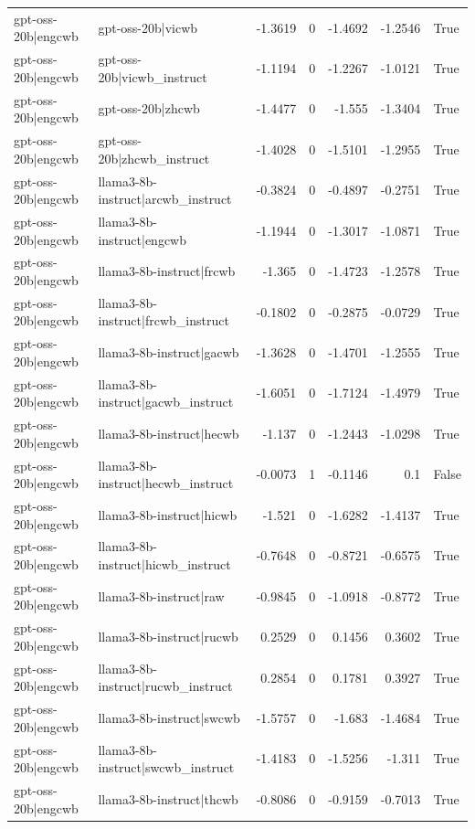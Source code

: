 \begin{table}
\begin{tabular}{l l r r r r l}
gpt-oss-20b|engcwb & gpt-oss-20b|vicwb & -1.3619 & 0 & -1.4692 & -1.2546 & True \\
gpt-oss-20b|engcwb & gpt-oss-20b|vicwb_instruct & -1.1194 & 0 & -1.2267 & -1.0121 & True \\
gpt-oss-20b|engcwb & gpt-oss-20b|zhcwb & -1.4477 & 0 & -1.555 & -1.3404 & True \\
gpt-oss-20b|engcwb & gpt-oss-20b|zhcwb_instruct & -1.4028 & 0 & -1.5101 & -1.2955 & True \\
gpt-oss-20b|engcwb & llama3-8b-instruct|arcwb_instruct & -0.3824 & 0 & -0.4897 & -0.2751 & True \\
gpt-oss-20b|engcwb & llama3-8b-instruct|engcwb & -1.1944 & 0 & -1.3017 & -1.0871 & True \\
gpt-oss-20b|engcwb & llama3-8b-instruct|frcwb & -1.365 & 0 & -1.4723 & -1.2578 & True \\
gpt-oss-20b|engcwb & llama3-8b-instruct|frcwb_instruct & -0.1802 & 0 & -0.2875 & -0.0729 & True \\
gpt-oss-20b|engcwb & llama3-8b-instruct|gacwb & -1.3628 & 0 & -1.4701 & -1.2555 & True \\
gpt-oss-20b|engcwb & llama3-8b-instruct|gacwb_instruct & -1.6051 & 0 & -1.7124 & -1.4979 & True \\
gpt-oss-20b|engcwb & llama3-8b-instruct|hecwb & -1.137 & 0 & -1.2443 & -1.0298 & True \\
gpt-oss-20b|engcwb & llama3-8b-instruct|hecwb_instruct & -0.0073 & 1 & -0.1146 & 0.1 & False \\
gpt-oss-20b|engcwb & llama3-8b-instruct|hicwb & -1.521 & 0 & -1.6282 & -1.4137 & True \\
gpt-oss-20b|engcwb & llama3-8b-instruct|hicwb_instruct & -0.7648 & 0 & -0.8721 & -0.6575 & True \\
gpt-oss-20b|engcwb & llama3-8b-instruct|raw & -0.9845 & 0 & -1.0918 & -0.8772 & True \\
gpt-oss-20b|engcwb & llama3-8b-instruct|rucwb & 0.2529 & 0 & 0.1456 & 0.3602 & True \\
gpt-oss-20b|engcwb & llama3-8b-instruct|rucwb_instruct & 0.2854 & 0 & 0.1781 & 0.3927 & True \\
gpt-oss-20b|engcwb & llama3-8b-instruct|swcwb & -1.5757 & 0 & -1.683 & -1.4684 & True \\
gpt-oss-20b|engcwb & llama3-8b-instruct|swcwb_instruct & -1.4183 & 0 & -1.5256 & -1.311 & True \\
gpt-oss-20b|engcwb & llama3-8b-instruct|thcwb & -0.8086 & 0 & -0.9159 & -0.7013 & True \\

\end{tabular}
\end{table}
